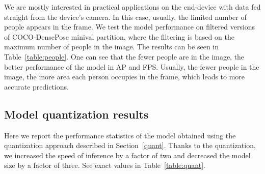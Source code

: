 We are mostly interested in practical applications on the end-device with data fed straight from the device's camera. In this case, usually, the limited number of people appears in the frame. We test the model performance on filtered versions of COCO-DensePose minival partition, where the filtering is based on the maximum number of people in the image. The results can be seen in Table~\ref{table:people}. One can see that the fewer people are in the image, the better performance of the model in AP and FPS. Usually, the fewer people in the image, the more area each person occupies in the frame, which leads to more accurate predictions.

\subsection{Model quantization results}

Here we report the performance statistics of the model obtained using the quantization approach described in Section~\ref{quant}. Thanks to the quantization, we increased the speed of inference by a factor of two and decreased the model size by a factor of three. See exact values in Table~\ref{table:quant}.


\begin{table}[!t]
\centering
{}
\caption{The effect of quantization. Results are obtained with Mobile Parsing R-CNN (B s3x, test-tuned) on DensePose-COCO minival. The shortest image side is 512 pixels}
\label{table:quant}
\end{table}